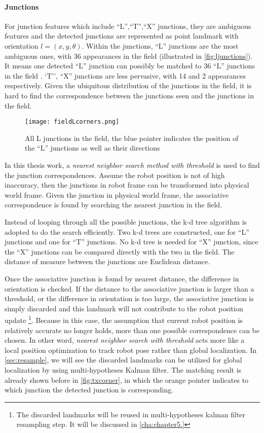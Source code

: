 \paragraph{Junctions}
For junction features which include ``L'',``T'',``X'' junctions, they are ambiguous features and the detected junctions are represented as point landmark with orientation $l = (x,y,\theta)$. Within the junctions, ``L'' junctions are the most ambiguous ones, with 36 appearances in the field (illustrated in \autoref{fig:ljunctions}). It means one detected ``L'' junction can possibly be matched to 36 ``L'' junctions in the field . `T'', ``X'' junctions are less pervasive, with 14 and 2 appearances respectively. Given the ubiquitous distribution of the junctions in the field, it is hard to find the correspondence between the junctions seen and the junctions in the field. \\
\begin{figure}[h!]
  \centering
  \texttt{[image: fieldLcorners.png]}
  \caption{All L junctions in the field, the blue pointer indicates the position of the ``L'' junctions as well as their directions}
  \label{fig:ljunctions}
\end{figure}

In this thesis work, a \textit{nearest neighbor search method with threshold} is used to find the junction correspondences. Assume the robot position is not of high inaccuracy, then the junctions in robot frame can be transformed into physical world frame. Given the junction in physical world frame, the associative correspondence is found by searching the nearest junction in the field. 

Instead of looping through all the possible junctions, the k-d tree algorithm \cite{Bentley1975} is adopted to do the search efficiently. Two k-d trees are constructed, one for ``L'' junctions and one for ``T'' junctions. No k-d tree is needed for ``X'' junction, since the ``X'' junctions can be compared directly with the two in the field. The distance of measure between the junctions are Euclidean distance. 

Once the associative junction is found by nearest distance, the difference in orientation is checked. If the distance to the associative junction is larger than a threshold, or the difference in orientation is too large, the associative junction is simply discarded and this landmark will not contribute to the robot position update \footnote{The discarded landmarks will be reused in multi-hypotheses kalman filter resampling step. It will be discussed in \autoref{cha:chapter5.}}. Because in this case, the assumption that current robot position is relatively accurate no longer holds, more than one possible correspondence can be chosen. In other word, \textit{nearest neighbor search with threshold} acts more like a local position optimization to track robot pose rather than global localization. In \autoref{sec:resample}, we will see the discarded landmarks can be utilized for global localization by using multi-hypotheses Kalman filter. The matching result is already shown before in \autoref{fig:txcorner}, in which the orange pointer indicates to which junction the detected junction is corresponding.

